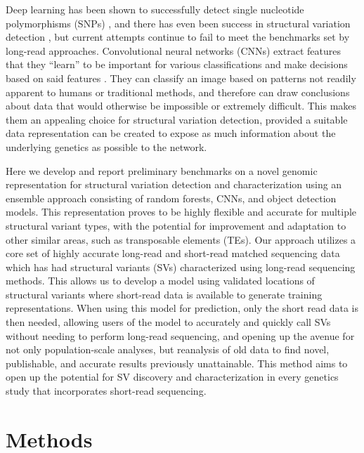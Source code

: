 Deep learning has been shown to successfully detect single nucleotide polymorphisms (SNPs) \cite{poplinUniversalSNPSmallindel2018}, and there has even been success in structural variation detection \cite{popicCueDeeplearningFramework2023,hillDeepLearningApproach2019}, but current attempts continue to fail to meet the benchmarks set by long-read approaches. Convolutional neural networks (CNNs) extract features that they “learn” to be important for various classifications and make decisions based on said features \cite{liSurveyConvolutionalNeural2022,lecunBackpropagationAppliedHandwritten1989,lecunGradientbasedLearningApplied1998}. They can classify an image based on patterns not readily apparent to humans or traditional methods, and therefore can draw conclusions about data that would otherwise be impossible or extremely difficult. This makes them an appealing choice for structural variation detection, provided a suitable data representation can be created to expose as much information about the underlying genetics as possible to the network.

Here we develop and report preliminary benchmarks on a novel genomic representation for structural variation detection and characterization using an ensemble approach consisting of random forests, CNNs, and object detection models. This representation proves to be highly flexible and accurate for multiple structural variant types, with the potential for improvement and adaptation to other similar areas, such as transposable elements (TEs). Our approach utilizes a core set of highly accurate long-read and short-read matched sequencing data which has had structural variants (SVs) characterized using long-read sequencing methods. This allows us to develop a model using validated locations of structural variants where short-read data is available to generate training representations. When using this model for prediction, only the short read data is then needed, allowing users of the model to accurately and quickly call SVs without needing to perform long-read sequencing, and opening up the avenue for not only population-scale analyses, but reanalysis of old data to find novel, publishable, and accurate results previously unattainable. This method aims to open up the potential for SV discovery and characterization in every genetics study that incorporates short-read sequencing.

\section{Methods}

